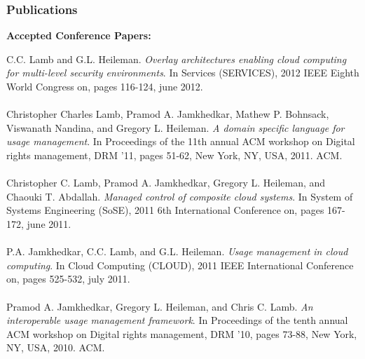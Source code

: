 \documentclass[t,handout]{beamer}
\begin{document}
\begin{frame}
\frametitle{Publications}
{\bf Accepted Conference Papers:} \\
\begin{scriptsize}
C.C. Lamb and G.L. Heileman. {\sl Overlay architectures enabling cloud computing for multi-level security environments}. In Services (SERVICES), 2012 IEEE Eighth World Congress on, pages 116-124, june 2012.\\
~\\
Christopher Charles Lamb, Pramod A. Jamkhedkar, Mathew P. Bohnsack, Viswanath Nandina, and Gregory L. Heileman. {\sl A domain specific language for usage management}. In Proceedings of the 11th annual ACM workshop on Digital rights management, DRM '11, pages 51-62, New York, NY, USA, 2011. ACM. \\
~\\
Christopher C. Lamb, Pramod A. Jamkhedkar, Gregory L. Heileman, and Chaouki T. Abdallah. {\sl Managed control of composite cloud systems}. In System of Systems Engineering (SoSE), 2011 6th International Conference on, pages 167-172, june 2011. \\
~\\
P.A. Jamkhedkar, C.C. Lamb, and G.L. Heileman. {\sl Usage management in cloud computing}. In Cloud Computing (CLOUD), 2011 IEEE International Conference on, pages 525-532, july 2011. \\
~\\
Pramod A. Jamkhedkar, Gregory L. Heileman, and Chris C. Lamb. {\sl An interoperable usage management framework}. In Proceedings of the tenth annual ACM workshop on Digital rights management, DRM '10, pages 73-88, New York, NY, USA, 2010. ACM. \\
~\\
\end{scriptsize}
\end{frame}
\end{document}
